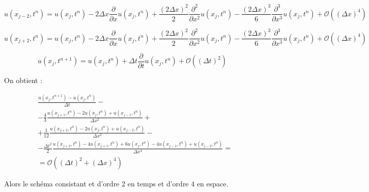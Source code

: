 \documentclass[a4paper,11pt]{article}
\begin{document}
\begin{equation*}
    u(x_{j-2}, t^{n}) =
    u(x_{j}, t^{n})
     - 2\Delta x \frac{\partial}{\partial x}u(x_{j}, t^{n})
     + \frac{(2\Delta x)^{2}}{2} \frac{\partial^{2}}{\partial x^{2}}u(x_{j}, t^{n})
     - \frac{(2\Delta x)^{3}}{6} \frac{\partial^{3}}{\partial x^{3}}u(x_{j}, t^{n})
     + \mathcal{O}((\Delta x)^{4})
\end{equation*}

\begin{equation*}
    u(x_{j+2}, t^{n}) =
    u(x_{j}, t^{n})
     - 2\Delta x \frac{\partial}{\partial x}u(x_{j}, t^{n})
     + \frac{(2\Delta x)^{2}}{2} \frac{\partial^{2}}{\partial x^{2}}u(x_{j}, t^{n})
     - \frac{(2\Delta x)^{3}}{6} \frac{\partial^{3}}{\partial x^{3}}u(x_{j}, t^{n})
     + \mathcal{O}((\Delta x)^{4})
\end{equation*}

\begin{equation*}
    u(x_{j}, t^{n+1}) =
    u(x_{j}, t^{n})    
     + \Delta t \frac{\partial}{\partial t}u(x_{j}, t^{n})
     + \mathcal{O}((\Delta t)^{2})
\end{equation*}

On obtient :

\begin{align*}
    & \frac{u(x_{j}, t^{n+1}) - u(x_{j}, t^{n})}{\Delta t} - \\
    & -\frac{4}{3} \frac{u(x_{j+1}, t^{n}) - 2u(x_{j}, t^{n}) + u(x_{j-1}, t^{n})}{\Delta x^{2}} + \\
    & +\frac{1}{12} \frac{u(x_{j+2}, t^{n}) - 2u(x_{j}, t^{n}) + u(x_{j-2}, t^{n})}{\Delta x^{2}} - \\
    & -\frac{\Delta t^{2}}{2} \frac{u(x_{j+2}, t^{n}) - 4u(x_{j+1}, t^{n}) + 6u(x_{j}, t^{n})  - 4u(x_{j-1}, t^{n}) + u(x_{j-2}, t^{n})}{\Delta x^{4}} = \\
   & = \mathcal{O}((\Delta t)^{2} + (\Delta x)^{4})
\end{align*}

Alors le schéma consistant et d'ordre 2 en temps et d'ordre 4 en espace.
\end{document}
